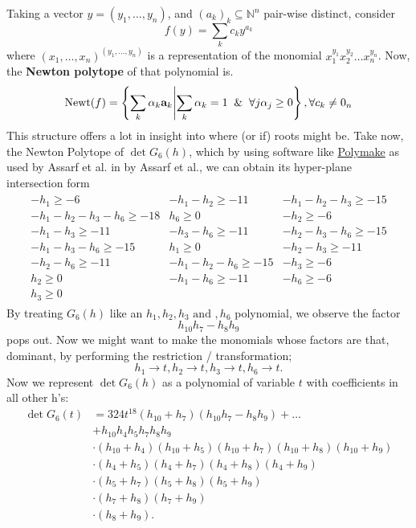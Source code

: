 Taking a vector $y = (y_1, \ldots, y_n)$, and $(a_k)_k \subseteq \mathbb{N}^n$ pair-wise distinct, consider
\[
 f(y) = \sum_{k} c_k y^{a_k}
\]
where $(x_1, \ldots, x_n)^{(y_1, \ldots, y_n)}$ is a representation of the monomial $x_1^{y_1} x_2^{y_2} \ldots x_n^{y_n}$.
Now, the \textbf{Newton polytope} of that polynomial is.
\[
	\mathrm{Newt}(f)=\left\{\sum_k\alpha_k\mathbf{a}_k \middle|\sum_k\alpha_k=1\And\forall j\alpha_j\geq0\right\}, \forall c_k \neq 0_n
\]
This structure offers a lot in insight into where (or if) roots might be.
Take now, the Newton Polytope of $\det G_6(h)$, which by using software like \href{https://polymake.org/doku.php/start}{Polymake}\cite{Gawrilow2000} as used by Assarf et al. in \cite{Assarf2017} by Assarf et al., we can obtain its hyper-plane intersection form
\begin{align*}
	\left.
	\begin{array}{ccc}
		-h_{1} \geq -6 &
		-h_{1} - h_{2} \geq -11 &
		-h_{1} - h_{2} - h_{3} \geq -15 \\
		-h_{1} - h_{2} - h_{3} - h_{6} \geq -18 &
		h_{6} \geq 0 &
		-h_{2} \geq -6 \\
		-h_{1} - h_{3} \geq -11 &
		-h_{3} - h_{6} \geq -11 &
		-h_{2} - h_{3} - h_{6} \geq -15 \\
		-h_{1} - h_{3} - h_{6} \geq -15 &
		h_{1} \geq 0 &
		-h_{2} - h_{3} \geq -11 \\
		-h_{2} - h_{6} \geq -11 &
		-h_{1} - h_{2} - h_{6} \geq -15 &
		-h_{3} \geq -6 \\
		h_{2} \geq 0 &
		-h_{1} - h_{6} \geq -11 &
		-h_{6} \geq -6 \\
		h_{3} \geq 0
	\end{array} \right.
\end{align*}
By treating $G_6(h)$ like an $h_1, h_2, h_3 \text{ and }, h_6$ polynomial, we observe the factor
\[
	h_{10}h_7 - h_8 h_9
\]
pops out. Now we might want to make the monomials whose factors are that, dominant, by performing the restriction / transformation;
\begin{equation}\label{h_substitution}
	h_1\to t,h_2\to t,h_3\to t,h_6\to t.
\end{equation}
Now we represent $\det G_6(h)$ as a polynomial of variable $t$ with coefficients in all other h's:
\begin{equation}\label{6th_hurwitz_det}
	\begin{aligned}
		\det G_6(t)
		&=324t^{18}(h_{10}+h_7)(h_{10}h_7-h_8h_9)+\ldots\\&+h_{10}h_4h_5h_7h_8h_9\\&\cdot(h_{10}+h_4)(h_{10}+h_5)(h_{10}+h_7)(h_{10}+h_8)(h_{10}+h_9)\\&\cdot(h_4+h_5)(h_4+h_7)(h_4+h_8)(h_4+h_9)\\&\cdot(h_5+h_7)(h_5+h_8)(h_5+h_9)\\&\cdot(h_7+h_8)(h_7+h_9)\\&\cdot(h_8+h_9).
	\end{aligned}	
\end{equation}
